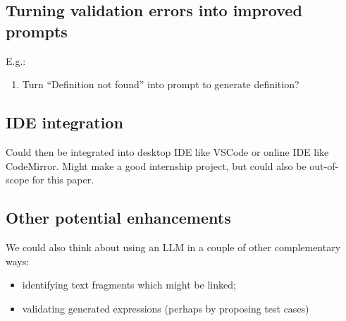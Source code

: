\subsection{Turning validation errors into improved prompts}\label{subsec:turning-validation-errors-into-improved-prompts}
E.g.:
\begin{enumerate}
\item Turn ``Definition not found'' into prompt to generate definition?
\end{enumerate}

\subsection{IDE integration}\label{subsec:ide-integration}

Could then be integrated into desktop IDE like VSCode or online IDE like CodeMirror. Might make a good
internship project, but could also be out-of-scope for this paper.

\subsection{Other potential enhancements}\label{subsec:other-potential-enhancements}

We could also think about using an LLM in a couple of other complementary ways:
\begin{itemize}
\item identifying text fragments which might be linked;
\item validating generated expressions (perhaps by proposing test cases)
\end{itemize}


